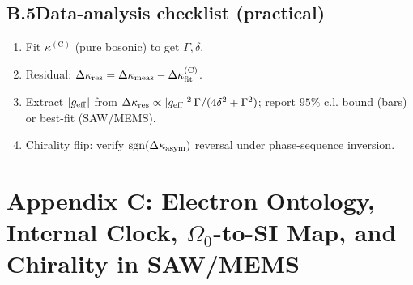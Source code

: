 \documentclass[aps,prb,preprint,amsmath,amssymb]{revtex4-2} %
\begin{document}
    \subsection*{B.5\quad Data-analysis checklist (practical)}
        \begin{enumerate}\itemsep2pt
        \item Fit \(\kappa^{(\mathrm C)}\) (pure bosonic) to get \(\Gamma,\delta\).
        \item Residual: \(\Delta\kappa_{\rm res}=\Delta\kappa_{\rm meas}-\Delta\kappa^{(\mathrm C)}_{\rm fit}\).
        \item Extract \(|g_{\rm eff}|\) from \(\Delta\kappa_{\rm res}\propto |g_{\rm eff}|^2\,\Gamma/(4\delta^2+\Gamma^2)\); report \(95\%\) c.l. bound (bars) or best-fit (SAW/MEMS).
        \item Chirality flip: verify \(\mathrm{sgn}(\Delta\kappa_{\rm asym})\) reversal under phase-sequence inversion.
        \end{enumerate}

\section*{Appendix C: Electron Ontology, Internal Clock, \texorpdfstring{$\Omega_{0}$}{Omega0}-to-SI Map, and Chirality in SAW/MEMS}
\end{document}
